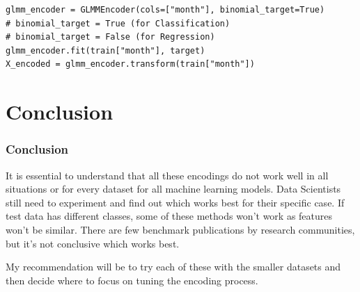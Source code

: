 \documentclass{beamer}
\begin{document}
    \begin{frame}[fragile]
        \begin{lstlisting}
glmm_encoder = GLMMEncoder(cols=["month"], binomial_target=True)
# binomial_target = True (for Classification)
# binomial_target = False (for Regression)
glmm_encoder.fit(train["month"], target)
X_encoded = glmm_encoder.transform(train["month"])
        \end{lstlisting}
    \end{frame}


    \section{Conclusion}
    \begin{frame}
        \frametitle{Conclusion}
        It is essential to understand that all these encodings do not work well in all situations
        or for every dataset for all machine learning models. Data Scientists still need to
        experiment and find out which works best for their specific case. If test data has
        different classes, some of these methods won't work as features won't be similar. There
        are few benchmark publications by research communities, but it's not conclusive which
        works best.

        My recommendation will be to try each of these with the smaller datasets and
        then decide where to focus on tuning the encoding process.
    \end{frame}
%
\end{document}
